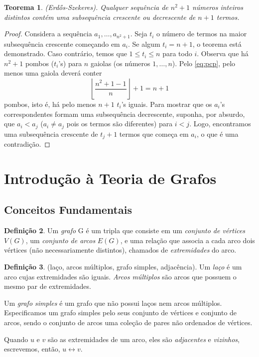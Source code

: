 \documentclass{article}
\theoremstyle{plain}
\newtheorem{thm}{Teorema}[section]
\theoremstyle{definition}
\newtheorem{defn}[thm]{Definição}
\theoremstyle{remark}
\begin{document}
\begin{thm} (Erdős-Szekeres).
    Qualquer sequência de \(n^2+1\) números inteiros distintos contém uma subsequência crescente ou decrescente de \(n+1\) termos.
\end{thm}

\begin{proof}
    Considera a sequência \(a_1, \ldots, a_{n^2+1}\). Seja \(t_i\) o número de termos na maior subsequência crescente começando em \(a_i\). Se algum \(t_i=n+1\), o teorema está demonstrado. 
    Caso contrário, temos que \(1\leq t_i \leq n\) para todo \(i\). Observa que há \(n^2+1\) pombos (\(t_i\)'s) para \(n\) gaiolas (os números \(1, \ldots, n\)). Pelo \eqref{eq:pcp}, pelo menos uma gaiola deverá conter
    \begin{equation*}
        \left \lfloor \frac{n^2+1-1}{n} \right \rfloor + 1 = n+1
    \end{equation*}
    \noindent pombos, isto é, há pelo menos \(n+1\) \(t_i\)'s iguais. Para mostrar que os \(a_i\)'s correspondentes formam uma subsequência decrescente, suponha, por absurdo, que \(a_i < a_j\) (\(a_i \neq a_j\) pois os termos são diferentes) para \(i < j\).
    Logo, encontramos uma subsequência crescente de \(t_{j}+1\) termos que começa em \(a_i\), o que é uma contradição.
\end{proof}

\section{Introdução à Teoria de Grafos}

\subsection{Conceitos Fundamentais}

\begin{defn}
    Um \emph{grafo} G é um tripla que consiste em um \emph{conjunto de vértices} \(V(G)\), um \emph{conjunto de arcos} \(E(G)\), e uma relação que associa a cada arco dois vértices (não necessariamente distintos), chamados de \emph{extremidades} do arco.
\end{defn}

\begin{defn} (laço, arcos múltiplos, grafo simples, adjacência).
    Um \emph{laço} é um arco cujas extremidades são iguais. \emph{Arcos múltiplos} são arcos que possuem o mesmo par de extremidades. 
    
    Um \emph{grafo simples} é um grafo que não possui laços nem arcos múltiplos. Especificamos um grafo simples pelo seus conjunto de vértices e conjunto de arcos, sendo o conjunto de arcos uma coleção de pares não ordenados de vértices. 
    
    Quando \(u\) e \(v\) são as extremidades de um arco, eles são \emph{adjacentes} e \emph{vizinhos}, escrevemos, então, \(u \leftrightarrow v\).
\end{defn}
\end{document}
